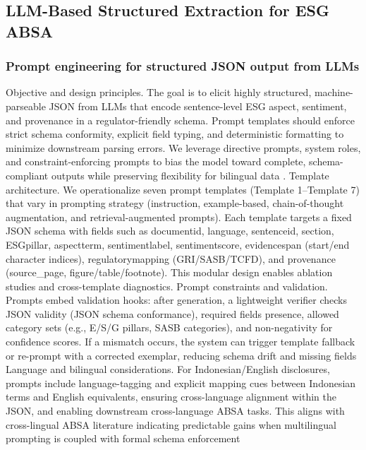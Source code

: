 \subsection{LLM-Based Structured Extraction for ESG ABSA}

\subsubsection{Prompt engineering for structured JSON output from LLMs}

Objective and design principles. The goal is to elicit highly structured, machine-parseable JSON from LLMs that encode sentence-level ESG aspect, sentiment, and provenance in a regulator-friendly schema. Prompt templates should enforce strict schema conformity, explicit field typing, and deterministic formatting to minimize downstream parsing errors. We leverage directive prompts, system roles, and constraint-enforcing prompts to bias the model toward complete, schema-compliant outputs while preserving flexibility for bilingual data \cite{10.4018/ijswis.385572,10.21203/rs.3.rs-6795706/v1,10.48550/arxiv.2510.04023} .
Template architecture. We operationalize seven prompt templates (Template 1–Template 7) that vary in prompting strategy (instruction, example-based, chain-of-thought augmentation, and retrieval-augmented prompts). Each template targets a fixed JSON schema with fields such as documentid, language, sentenceid, section, ESGpillar, aspectterm, sentimentlabel, sentimentscore, evidencespan (start/end character indices), regulatorymapping (GRI/SASB/TCFD), and provenance (source\_page, figure/table/footnote). This modular design enables ablation studies and cross-template diagnostics.
Prompt constraints and validation. Prompts embed validation hooks: after generation, a lightweight verifier checks JSON validity (JSON schema conformance), required fields presence, allowed category sets (e.g., E/S/G pillars, SASB categories), and non-negativity for confidence scores. If a mismatch occurs, the system can trigger template fallback or re-prompt with a corrected exemplar, reducing schema drift and missing fields \cite{10.18653/v1/2023.emnlp-demo.3,10.1088/2515-7620/ae1357}
Language and bilingual considerations. For Indonesian/English disclosures, prompts include language-tagging and explicit mapping cues between Indonesian terms and English equivalents, ensuring cross-language alignment within the JSON, and enabling downstream cross-language ABSA tasks. This aligns with cross-lingual ABSA literature indicating predictable gains when multilingual prompting is coupled with formal schema enforcement\cite{10.1016/j.inffus.2025.103073,10.1111/eufm.12509,10.48550/arxiv.2511.00024}

